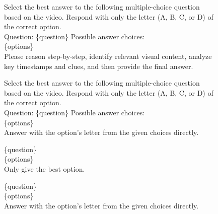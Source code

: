 \begin{figure}[h]
\begin{tcolorbox}[colback=black!7.5!white, colframe=black!80!white, title=Video-MME\space \textbar\space MVBench -- For Qwen series thinking models, fontupper=\footnotesize, fontlower=\footnotesize, fonttitle=\footnotesize]

Select the best answer to the following multiple-choice question based on the video.
Respond with only the letter (A, B, C, or D) of the correct option.\\
Question: \{question\} Possible answer choices:\\
\{options\}\\
Please reason step-by-step, identify relevant visual content, analyze key timestamps and
clues, and then provide the final answer.
\end{tcolorbox}

\end{figure}

\begin{figure}[h]
\begin{tcolorbox}[colback=black!7.5!white, colframe=black!80!white, title=Video-MME -- For other models, fontupper=\footnotesize, fontlower=\footnotesize, fonttitle=\footnotesize]

Select the best answer to the following multiple-choice question based on the video.
Respond with only the letter (A, B, C, or D) of the correct option.\\
Question: \{question\} Possible answer choices:\\
\{options\}\\
Answer with the option's letter from the given choices directly.
\end{tcolorbox}
\end{figure}

\begin{figure}[h]
\begin{tcolorbox}[colback=black!7.5!white, colframe=black!80!white, title=MVBench -- For other models, fontupper=\footnotesize, fontlower=\footnotesize, fonttitle=\footnotesize]

\{question\}\\
\{options\}\\
Only give the best option.
\end{tcolorbox}
\end{figure}


\begin{figure}[h]
\begin{tcolorbox}[colback=black!7.5!white, colframe=black!80!white, title=LongVideoBench -- For other models, fontupper=\footnotesize, fontlower=\footnotesize, fonttitle=\footnotesize]
\{question\}\\
\{options\}\\
Answer with the option's letter from the given choices directly.
\end{tcolorbox}
\end{figure}





